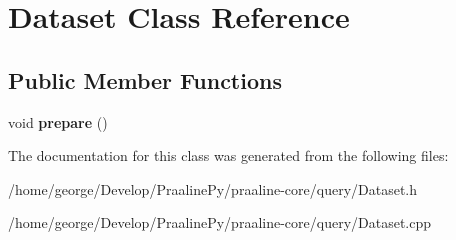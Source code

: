 \hypertarget{class_dataset}{}\section{Dataset Class Reference}
\label{class_dataset}
\subsection*{Public Member Functions}
\begin{DoxyCompactItemize}
\item 
\mbox{\label{class_dataset_a3ea4262e4c5f78c6c08892ec36154912}} 
void {\bfseries prepare} ()
\end{DoxyCompactItemize}


The documentation for this class was generated from the following files\+:\begin{DoxyCompactItemize}
\item 
/home/george/\+Develop/\+Praaline\+Py/praaline-\/core/query/Dataset.\+h\item 
/home/george/\+Develop/\+Praaline\+Py/praaline-\/core/query/Dataset.\+cpp\end{DoxyCompactItemize}
